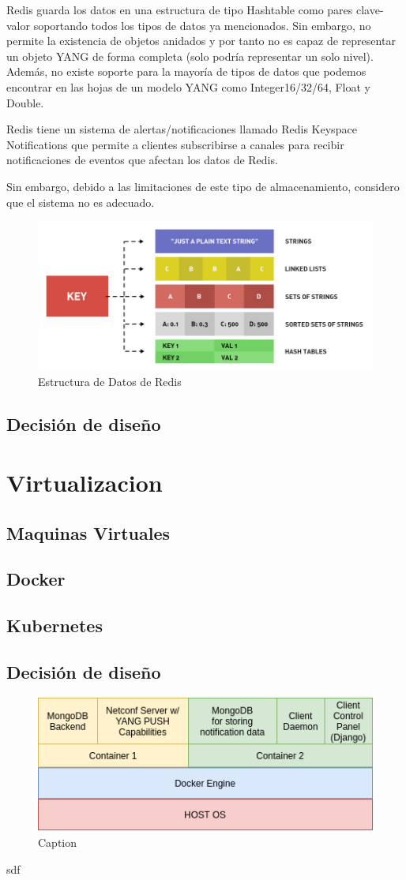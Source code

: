 Redis guarda los datos en una estructura de tipo Hashtable como pares clave-valor soportando todos los
tipos de datos ya mencionados. Sin embargo, no permite la existencia de objetos anidados y por tanto no es capaz de representar un objeto YANG de forma completa (solo podría representar un solo nivel).
Además, no existe soporte para la mayoría de tipos de datos que podemos encontrar en las hojas de un modelo YANG como Integer16/32/64, Float y Double.

Redis tiene un sistema de alertas/notificaciones llamado Redis Keyspace Notifications que permite
a clientes subscribirse a canales para recibir notificaciones de eventos que afectan los datos de Redis. 

Sin embargo, debido a las limitaciones de este tipo de almacenamiento, considero que el sistema no es adecuado.

\begin{figure}
    \centering
    \includegraphics[width=15cm]{graphics/redis-data-structure-types.jpeg}
    \caption{Estructura de Datos de Redis}
    \label{fig:redis_estructura}
\end{figure}

\subsection{Decisión de diseño}


\section{Virtualizacion}
  \subsection{Maquinas Virtuales}
  \subsection{Docker}
  \subsection{Kubernetes}
\subsection{Decisión de diseño}

\begin{figure}
    \centering
    \includegraphics{graphics/docker.png}
    \caption{Caption}
    \label{fig:my_label}
\end{figure}
sdf